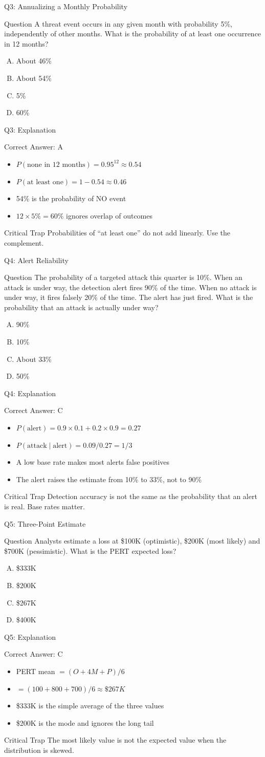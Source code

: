 \documentclass[aspectratio=169]{beamer}
\newcommand{\hq}[7]{%
  \begin{frame}{Q#1: #2}
    \begin{block}{Question}
      #3
    \end{block}
    \begin{enumerate}[(A)]
      #4
    \end{enumerate}
  \end{frame}
  \begin{frame}{Q#1: Explanation}
    \begin{block}{Correct Answer: #5}
      \begin{itemize}
        #6
      \end{itemize}
    \end{block}
    \begin{alertblock}{Critical Trap}
      #7
    \end{alertblock}
  \end{frame}
}
\begin{document}
\hq{3}{Annualizing a Monthly Probability}
{A threat event occurs in any given month with probability 5\%, independently of other months. What is the probability of at least one occurrence in 12 months?}
{\item About 46\%
 \item About 54\%
 \item 5\%
 \item 60\%}
{A}
{\item $P(\text{none in 12 months}) = 0.95^{12} \approx 0.54$
 \item $P(\text{at least one}) = 1 - 0.54 \approx 0.46$
 \item 54\% is the probability of NO event
 \item $12 \times 5\% = 60\%$ ignores overlap of outcomes}
{Probabilities of ``at least one'' do not add linearly. Use the complement.}

\hq{4}{Alert Reliability}
{The probability of a targeted attack this quarter is 10\%. When an attack is under way, the detection alert fires 90\% of the time. When no attack is under way, it fires falsely 20\% of the time. The alert has just fired. What is the probability that an attack is actually under way?}
{\item 90\%
 \item 10\%
 \item About 33\%
 \item 50\%}
{C}
{\item $P(\text{alert}) = 0.9 \times 0.1 + 0.2 \times 0.9 = 0.27$
 \item $P(\text{attack} \mid \text{alert}) = 0.09 / 0.27 = 1/3$
 \item A low base rate makes most alerts false positives
 \item The alert raises the estimate from 10\% to 33\%, not to 90\%}
{Detection accuracy is not the same as the probability that an alert is real. Base rates matter.}

\hq{5}{Three-Point Estimate}
{Analysts estimate a loss at \$100K (optimistic), \$200K (most likely) and \$700K (pessimistic). What is the PERT expected loss?}
{\item \$333K
 \item \$200K
 \item \$267K
 \item \$400K}
{C}
{\item PERT mean $= (O + 4M + P)/6$
 \item $= (100 + 800 + 700)/6 \approx \$267K$
 \item \$333K is the simple average of the three values
 \item \$200K is the mode and ignores the long tail}
{The most likely value is not the expected value when the distribution is skewed.}
\end{document}
